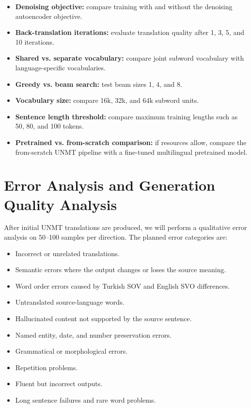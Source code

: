 \documentclass[11pt]{article}
\begin{document}
\begin{itemize}
    \item \textbf{Denoising objective:} compare training with and without the denoising autoencoder objective.
    \item \textbf{Back-translation iterations:} evaluate translation quality after 1, 3, 5, and 10 iterations.
    \item \textbf{Shared vs. separate vocabulary:} compare joint subword vocabulary with language-specific vocabularies.
    \item \textbf{Greedy vs. beam search:} test beam sizes 1, 4, and 8.
    \item \textbf{Vocabulary size:} compare 16k, 32k, and 64k subword units.
    \item \textbf{Sentence length threshold:} compare maximum training lengths such as 50, 80, and 100 tokens.
    \item \textbf{Pretrained vs. from-scratch comparison:} if resources allow, compare the from-scratch UNMT pipeline with a fine-tuned multilingual pretrained model.
\end{itemize}

\section{Error Analysis and Generation Quality Analysis}

After initial UNMT translations are produced, we will perform a qualitative error analysis on 50--100 samples per direction. The planned error categories are:

\begin{itemize}
    \item Incorrect or unrelated translations.
    \item Semantic errors where the output changes or loses the source meaning.
    \item Word order errors caused by Turkish SOV and English SVO differences.
    \item Untranslated source-language words.
    \item Hallucinated content not supported by the source sentence.
    \item Named entity, date, and number preservation errors.
    \item Grammatical or morphological errors.
    \item Repetition problems.
    \item Fluent but incorrect outputs.
    \item Long sentence failures and rare word problems.
\end{itemize}
\end{document}
